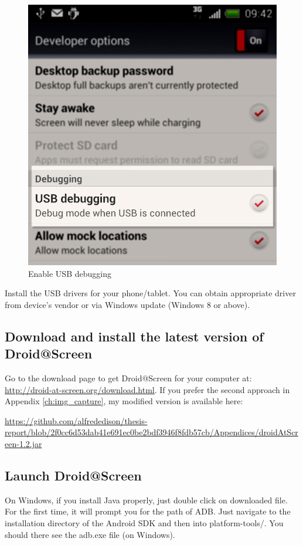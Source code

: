     \begin{figure}[H]
		\centering
		\includegraphics[scale=0.5]{Chapters/Fig/usb-db.png}
		\caption{Enable USB debugging}
		\label{fig:usb-db}
	\end{figure}
	
Install the USB drivers for your phone/tablet. You can obtain appropriate driver from device's vendor or via Windows update (Windows 8 or above).

\subsection{Download and install the latest version of Droid@Screen}
Go to the download page to get Droid@Screen for your computer at:
\newline
\url{http://droid-at-screen.org/download.html}.
\newline
If you prefer the second approach in Appendix \ref{ch:img_capture}, my modified version is available here:
\newline
\raggedright %
\url{https://github.com/alfrededison/thesis-report/blob/2f0cc6d53dab41e691ec0be2bdf3946f8fdb57cb/Appendices/droidAtScreen-1.2.jar}

\subsection{Launch Droid@Screen}
On Windows, if you install Java properly, just double click on downloaded file.
\newline
For the first time, it will prompt you for the path of ADB. Just navigate to the installation directory of the Android SDK and then into platform-tools/. You should there see the adb.exe file (on Windows).

